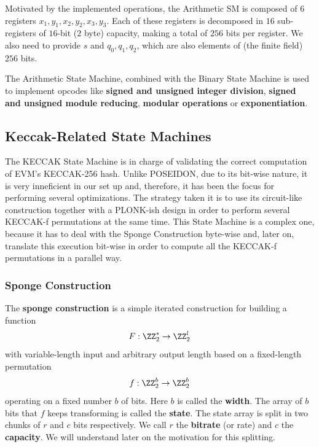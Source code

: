 Motivated by the implemented operations, the Arithmetic SM is composed of $6$ registers $x_1,y_1,x_2,y_2,x_3,y_3$. Each of these registers is decomposed in $16$ sub-registers of $16$-bit ($2$ byte) capacity, making a total of $256$ bits per register. We also need to provide $s$ and $q_0,q_1,q_2$, which are also elements of (the finite field) $256$ bits. 

The Arithmetic State Machine, combined with the Binary State Machine is used to implement opcodes like \textbf{signed and unsigned integer division}, \textbf{signed and unsigned module reducing}, \textbf{modular operations} or \textbf{exponentiation}. 







\subsection{Keccak-Related State Machines}


The KECCAK State Machine is in charge of validating the correct computation of EVM's KECCAK-256 hash. Unlike POSEIDON, due to its bit-wise nature, it is very inneficient in our set up and, therefore, it has been the focus for performing several optimizations. The strategy taken it is to use its circuit-like construction together with a PLONK-ish design in order to perform several KECCAK-f permutations at the same time. This State Machine is a complex one, because it has to deal with the Sponge Construction byte-wise and, later on, translate this execution bit-wise in order to compute all the KECCAK-f permutations in a parallel way. 

\subsubsection*{Sponge Construction}

The \textbf{sponge construction} is a simple iterated construction for building a function 
\[
F: \ZZ_2^* \to \ZZ_2^l
\] 
with variable-length input and arbitrary output length based on a fixed-length permutation
\[
f: \ZZ_2^b \to \ZZ_2^b
\] 
operating on a fixed number $b$ of bits. Here $b$ is called the \textbf{width}. The array of $b$ bits that $f$ keeps transforming is called the \textbf{state}. The state array is split in two chunks of $r$ and $c$ bits respectively. We call $r$ the \textbf{bitrate} (or rate) and $c$ the \textbf{capacity}. We will understand later on the motivation for this splitting. 

